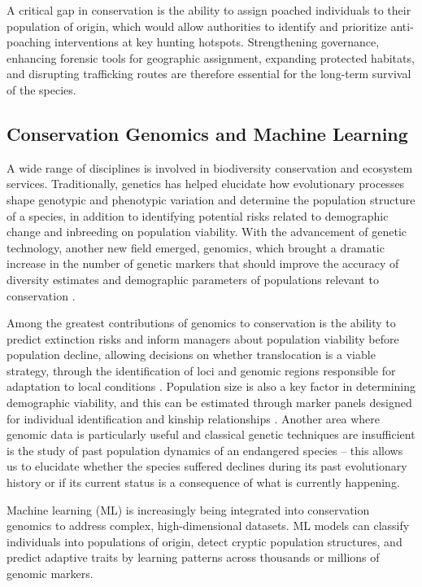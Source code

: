 \documentclass[twocolumn,10pt]{article}
\begin{document}
A critical gap in conservation is the ability to assign poached individuals to their population of
origin, which would allow authorities to identify and prioritize anti-poaching interventions at key
hunting hotspots. Strengthening governance, enhancing forensic tools for geographic assignment,
expanding protected habitats, and disrupting trafficking routes are therefore essential for the
long-term survival of the species.

\subsection*{Conservation Genomics and Machine Learning}

A wide range of disciplines is involved in biodiversity conservation and ecosystem services.
Traditionally, genetics has helped elucidate how evolutionary processes shape genotypic and
phenotypic variation and determine the population structure of a species, in addition to identifying
potential risks related to demographic change and inbreeding on population viability. With the
advancement of genetic technology, another new field emerged, genomics, which brought a dramatic
increase in the number of genetic markers that should improve the accuracy of diversity estimates
and demographic parameters of populations relevant to conservation \citep{shafer2015genomics}.

Among the greatest contributions of genomics to conservation is the ability to predict extinction
risks and inform managers about population viability before population decline, allowing decisions
on whether translocation is a viable strategy, through the identification of loci and genomic
regions responsible for adaptation to local conditions \citep{mcmahon2014how}. Population size is
also a key factor in determining demographic viability, and this can be estimated through marker
panels designed for individual identification and kinship relationships
\citep{hohenlohe2021population}. Another area where genomic data is particularly useful and
classical genetic techniques are insufficient is the study of past population dynamics of an
endangered species – this allows us to elucidate whether the species suffered declines during its
past evolutionary history or if its current status is a consequence of what is currently happening.

Machine learning (ML) is increasingly being integrated into conservation genomics to address
complex, high-dimensional datasets. ML models can classify individuals into populations of origin,
detect cryptic population structures, and predict adaptive traits by learning patterns across
thousands or millions of genomic markers.
\end{document}
